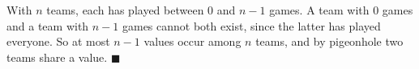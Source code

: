 With $n$ teams, each has played between $0$ and $n-1$ games. A team with $0$ games and a team with $n-1$ games cannot both exist, since the latter has played everyone. So at most $n-1$ values occur among $n$ teams, and by pigeonhole two teams share a value. $\blacksquare$

